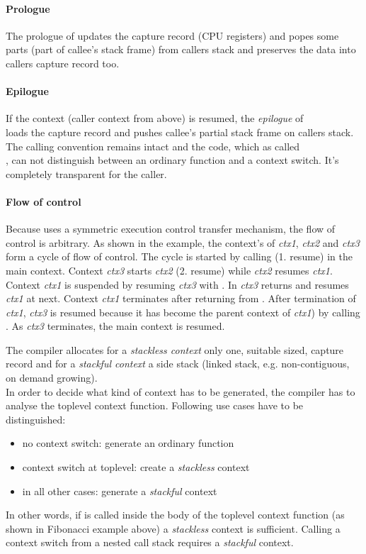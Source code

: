 \paragraph*{Prologue}
The prologue of \ectxop updates the capture record (CPU registers) and popes
some parts (part of callee's stack frame) from callers stack and preserves the
data into callers capture record too.

\paragraph*{Epilogue}
If the context (caller context from above) is resumed, the \emph{epilogue} of\\
\ectxop loads the capture record and pushes callee's partial stack frame on
callers stack. The calling convention remains intact and the code, which as
called\\
\ectxop, can not distinguish between an ordinary function and a context switch.
It's completely transparent for the caller.

\paragraph*{Flow of control}
Because \ectx uses a symmetric execution control transfer mechanism, the flow
of control is arbitrary.
As shown in the example, the context's of \emph{ctx1}, \emph{ctx2} and
\emph{ctx3} form a cycle of flow of control.
The cycle is started by calling  (1. resume) in the main context.
Context \emph{ctx3} starts \emph{ctx2} (2. resume) while \emph{ctx2} resumes
\emph{ctx1}. Context \emph{ctx1} is suspended by resuming \emph{ctx3} with
. In \emph{ctx3}  returns and  resumes
\emph{ctx1} at next. Context \emph{ctx1} terminates after returning from
. After termination of \emph{ctx1}, \emph{ctx3} is resumed
because it has become the parent context of \emph{ctx1}) by calling .
As \emph{ctx3} terminates, the main context is resumed.

The compiler allocates for a \emph{stackless context} only one, suitable sized,
capture record and for a \emph{stackful context} a side stack (linked stack,
e.g. non-contiguous, on demand growing).\\
In order to decide what kind of context has to be generated, the compiler has to
analyse the toplevel context function. Following use cases have to be
distinguished:
\begin{itemize}
    \item no context switch: generate an ordinary function
    \item context switch at toplevel: create a \emph{stackless} context
    \item in all other cases: generate a \emph{stackful} context
\end{itemize}
In other words, if \ectxop is called inside the body of the toplevel context
function (as shown in Fibonacci example above) a \emph{stackless} context is
sufficient.
Calling a context switch from a nested call stack requires a \emph{stackful}
context.
